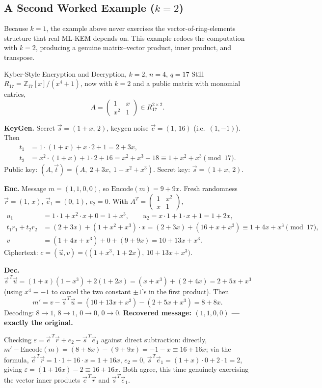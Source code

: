 \subsection{A Second Worked Example ($k=2$)}
\label{sec:L3:a-vector-worked-example}

Because $k=1$, the example above never exercises the vector-of-ring-elements structure that real ML-KEM depends on. This example redoes the computation with $k=2$, producing a genuine matrix--vector product, inner product, and transpose.

\begin{exbox}{Kyber-Style Encryption and Decryption, $k=2$, $n=4$, $q=17$}
Still $R_{17}=\mathbb{Z}_{17}[x]/(x^4+1)$, now with $k=2$ and a public matrix with monomial entries,
$$
A = \begin{pmatrix} 1 & x \\ x^2 & 1 \end{pmatrix} \in R_{17}^{2\times2}.
$$

\textbf{KeyGen.} Secret $\vec s=(1+x,\,2)$, keygen noise $\vec e=(1,\,16)$ (i.e.\ $(1,-1)$). Then
\begin{align*}
t_1 &= 1\cdot(1+x)+x\cdot2+1 = 2+3x, \\
t_2 &= x^2\cdot(1+x)+1\cdot2+16 = x^2+x^3+18 \equiv 1+x^2+x^3 \pmod{17}.
\end{align*}
Public key: $(A,\vec t)=(A,\ 2+3x,\ 1+x^2+x^3)$. Secret key: $\vec s=(1+x,\,2)$.

\textbf{Enc.} Message $m=(1,1,0,0)$, so $\mathrm{Encode}(m)=9+9x$. Fresh randomness $\vec r=(1,\,x)$, $\vec e_1=(0,\,1)$, $e_2=0$. With $A^T=\begin{pmatrix}1&x^2\\x&1\end{pmatrix}$,
\begin{align*}
u_1 &= 1\cdot1+x^2\cdot x+0 = 1+x^3, \qquad u_2 = x\cdot1+1\cdot x+1 = 1+2x,\\
t_1r_1+t_2r_2 &= (2+3x) + (1+x^2+x^3)\cdot x = (2+3x)+(16+x+x^3) \equiv 1+4x+x^3\pmod{17},\\
v &= (1+4x+x^3)+0+(9+9x) = 10+13x+x^3.
\end{align*}
Ciphertext: $c=(\vec u,v)=\big((1+x^3,\ 1+2x),\ 10+13x+x^3\big)$.

\textbf{Dec.} $\vec s^{\,T}\vec u = (1+x)(1+x^3)+2(1+2x) = (x+x^3)+(2+4x) = 2+5x+x^3$ (using $x^4\equiv-1$ to cancel the two constant $\pm1$'s in the first product). Then
$$
m' = v-\vec s^{\,T}\vec u = (10+13x+x^3)-(2+5x+x^3) = 8+8x.
$$
Decoding: $8\to1$, $8\to1$, $0\to0$, $0\to0$. \textbf{Recovered message: $(1,1,0,0)$ --- exactly the original.}

Checking $\varepsilon=\vec e^{\,T}\vec r+e_2-\vec s^{\,T}\vec e_1$ against direct subtraction: directly, $m'-\mathrm{Encode}(m) = (8+8x)-(9+9x) = -1-x\equiv16+16x$; via the formula, $\vec e^{\,T}\vec r = 1\cdot1+16\cdot x = 1+16x$, $e_2=0$, $\vec s^{\,T}\vec e_1 = (1+x)\cdot0+2\cdot1=2$, giving $\varepsilon=(1+16x)-2\equiv16+16x$. Both agree, this time genuinely exercising the vector inner products $\vec e^{\,T}\vec r$ and $\vec s^{\,T}\vec e_1$.
\end{exbox}


